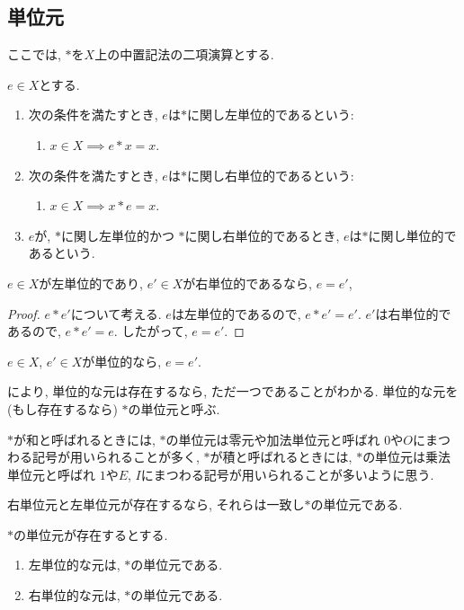 \subsection{単位元}
ここでは,
$\ast$を$X$上の中置記法の二項演算とする.
\begin{definition}
  $e\in X$とする.
  \begin{enumerate}
  \item
    次の条件を満たすとき,
    $e$は$\ast$に関し左単位的であるという:
    \begin{enumerate}
    \item $x\in X\implies e\ast x=x$.
    \end{enumerate}
  \item
    次の条件を満たすとき,
    $e$は$\ast$に関し右単位的であるという:
    \begin{enumerate}
    \item $x\in X\implies x\ast e=x$.
    \end{enumerate}
  \item
    $e$が,
    $\ast$に関し左単位的かつ
    $\ast$に関し右単位的であるとき,
    $e$は$\ast$に関し単位的であるという.
  \end{enumerate}
\end{definition}
\begin{lemma}
  $e\in X$が左単位的であり,
  $e'\in X$が右単位的であるなら,
  $e=e'$,
\end{lemma}
\begin{proof}
  $e\ast e'$について考える.
  $e$は左単位的であるので, $e\ast e'=e'$.
  $e'$は右単位的であるので, $e\ast e'=e$.
  したがって, $e=e'$.
\end{proof}
\begin{cor}
\label{cor:uniq:unit}
  $e\in X$, $e'\in X$が単位的なら,
  $e=e'$.
\end{cor}
\begin{remark}
  により,
  単位的な元は存在するなら, ただ一つであることがわかる.
  単位的な元を (もし存在するなら)
  $\ast$の単位元と呼ぶ.

  $\ast$が和と呼ばれるときには,
  $\ast$の単位元は零元や加法単位元と呼ばれ
  $0$や$O$にまつわる記号が用いられることが多く,
  $\ast$が積と呼ばれるときには, $\ast$の単位元は乗法単位元と呼ばれ
  $1$や$E$, $I$にまつわる記号が用いられることが多いように思う.
\end{remark}
\begin{cor}
  右単位元と左単位元が存在するなら,
  それらは一致し$\ast$の単位元である.
\end{cor}
\begin{cor}
  $\ast$の単位元が存在するとする.
  \begin{enumerate}
  \item 左単位的な元は, $\ast$の単位元である.
  \item 右単位的な元は, $\ast$の単位元である.
  \end{enumerate}
\end{cor}

